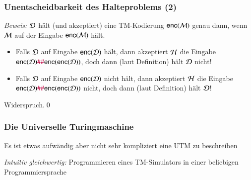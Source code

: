 \documentclass[aspectratio=1610,onlymath]{beamer}
\begin{document}
\begin{frame}[t]\frametitle{Unentscheidbarkeit des Halteproblems (2)}


\emph{Beweis:} $\mathcal{D}$ hält (und akzeptiert) eine TM-Kodierung $\textsf{enc}(\mathcal{M})$ genau dann, wenn
$\mathcal{M}$ auf der Eingabe $\textsf{enc}(\mathcal{M})$  hält.\pause
\medskip

\pause
\begin{itemize}
\item Falls $\mathcal{D}$ auf Eingabe $\textsf{enc}(\mathcal{D})$ hält, dann akzeptiert $\mathcal{H}$
die Eingabe $\textsf{enc}(\mathcal{D})\mathtt{\textcolor{purple}{\#}}\mathtt{\textcolor{purple}{\#}}\textsf{enc}(\textsf{enc}(\mathcal{D}))$,
doch dann (laut Definition) hält $\mathcal{D}$ nicht!\pause
\item Falls $\mathcal{D}$ auf Eingabe $\textsf{enc}(\mathcal{D})$ nicht hält, dann akzeptiert $\mathcal{H}$
die Eingabe $\textsf{enc}(\mathcal{D})\mathtt{\textcolor{purple}{\#}}\mathtt{\textcolor{purple}{\#}}\textsf{enc}(\textsf{enc}(\mathcal{D}))$ nicht,
doch dann (laut Definition) hält $\mathcal{D}$!
\end{itemize}
Widerspruch.\qed

\end{frame}

\begin{frame}\frametitle{Die Universelle Turingmaschine}




Es ist etwas aufwändig aber nicht sehr kompliziert eine UTM zu beschreiben
\medskip

\emph{Intuitiv gleichwertig:} Programmieren eines TM-Simulators in einer beliebigen Programmiersprache

\end{frame}
\end{document}
